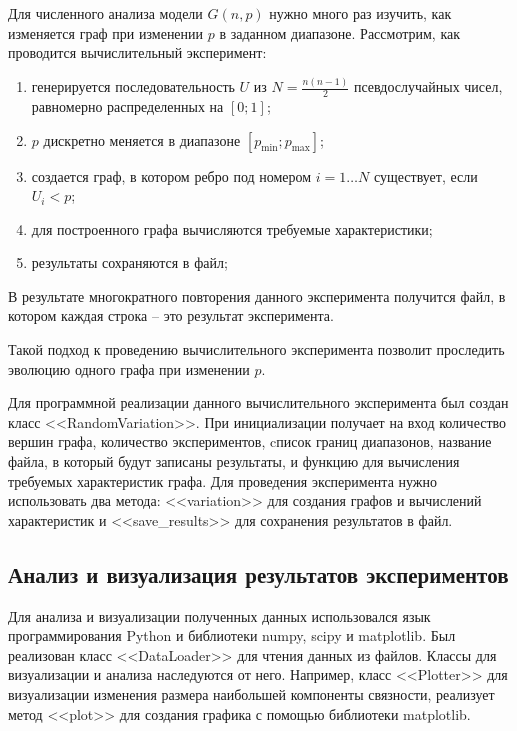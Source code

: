 Для численного анализа модели $G(n,p)$ нужно 
много раз изучить, как изменяется граф при изменении $p$ 
в заданном диапазоне. Рассмотрим, как проводится вычислительный эксперимент:
\begin{enumerate}
        \item генерируется последовательность $U$ из 
            $ N = \frac{n(n-1)}{2}$ псевдослучайных чисел, равномерно распределенных на $[0;1]$;
        \item $p$ дискретно меняется в диапазоне  $[p_{\min}; p_{\max}]$;
        \item создается граф, в котором ребро под 
            номером $i = 1 \dots N$ существует, если
             $U_{i} < p$;
        \item для построенного графа вычисляются требуемые характеристики;
        \item результаты сохраняются в файл;
\end{enumerate}

В результате многократного повторения данного эксперимента 
получится файл, в котором каждая строка -- 
это результат эксперимента.

Такой подход к проведению вычислительного эксперимента позволит 
проследить эволюцию одного графа при изменении $p$.

Для программной реализации данного вычислительного эксперимента был создан класс <<RandomVariation>>. При инициализации получает 
на вход количество вершин графа, количество экспериментов, 
cписок границ диапазонов, название файла, в который будут записаны результаты, и функцию для вычисления требуемых характеристик графа. Для проведения эксперимента нужно использовать два метода:
<<variation>> для создания графов и вычислений характеристик и
<<save\_results>> для сохранения результатов в файл.

\subsection{Анализ и визуализация результатов экспериментов}

Для анализа и визуализации полученных данных использовался 
язык программирования Python и библиотеки 
numpy, scipy и matplotlib. Был реализован класс <<DataLoader>> 
для чтения данных из файлов. Классы для визуализации и анализа 
наследуются от него. Например, класс <<Plotter>> для визуализации 
изменения размера наибольшей компоненты связности, реализует
метод <<plot>> для создания графика с помощью библиотеки matplotlib.
